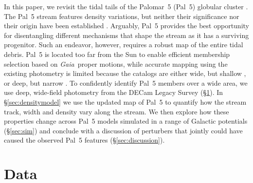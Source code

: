 \documentclass[twocolumn]{aastex62}
\newcommand{\gaia}{\textsl{Gaia}}
\begin{document}
In this paper, we revisit the tidal tails of the Palomar~5 (Pal~5) globular cluster \citep{Odenkirchen:2001, Rockosi:2002}.
The Pal~5 stream features density variations, but neither their significance nor their origin have been established \citep{Carlberg:2012, Bernard:2016, Ibata:2016, Thomas:2016, Erkal:2017}.
Arguably, Pal~5 provides the best opportunity for disentangling different mechanisms that shape the stream as it has a surviving progenitor.
Such an endeavor, however, requires a robust map of the entire tidal debris.
Pal~5 is located too far from the Sun to enable efficient membership selection based on \gaia\ proper motions, while accurate mapping using the existing photometry is limited because the catalogs are either wide, but shallow \citep{Bernard:2016}, or deep, but narrow \citep{Ibata:2016}.
To confidently identify Pal~5 members over a wide area, we use deep, wide-field photometry from the DECam Legacy Survey (\S\ref{sec:data}).
In \S\ref{sec:densitymodel} we use the updated map of Pal~5 to quantify how the stream track, width and density vary along the stream.
We then explore how these properties change across Pal~5 models simulated in a range of Galactic potentials (\S\ref{sec:sim}) and conclude with a discussion of perturbers that jointly could have caused the observed Pal~5 features (\S\ref{sec:discussion}).


\section{Data}
\label{sec:data}
\end{document}
